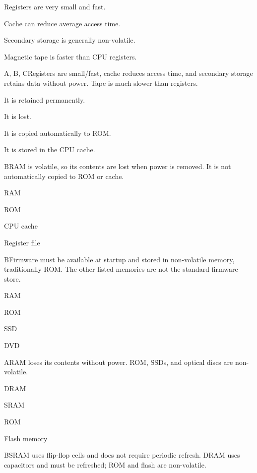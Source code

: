 \begin{enumerate}[label=\textbf{Q\arabic*.}, leftmargin=*]
  {\item Registers are very small and fast.
   \item Cache can reduce average access time.
   \item Secondary storage is generally non-volatile.
   \item Magnetic tape is faster than CPU registers.}
  {A, B, C}{Registers are small/fast, cache reduces access time, and secondary storage retains data without power. Tape is much slower than registers.}
\fi
\ifnum{}
  {\item It is retained permanently.
   \item It is lost.
   \item It is copied automatically to ROM.
   \item It is stored in the CPU cache.}
  {B}{RAM is volatile, so its contents are lost when power is removed. It is not automatically copied to ROM or cache.}
  {\item RAM
   \item ROM
   \item CPU cache
   \item Register file}
  {B}{Firmware must be available at startup and stored in non-volatile memory, traditionally ROM. The other listed memories are not the standard firmware store.}
  {\item RAM
   \item ROM
   \item SSD
   \item DVD}
  {A}{RAM loses its contents without power. ROM, SSDs, and optical discs are non-volatile.}
  {\item DRAM
   \item SRAM
   \item ROM
   \item Flash memory}
  {B}{SRAM uses flip-flop cells and does not require periodic refresh. DRAM uses capacitors and must be refreshed; ROM and flash are non-volatile.}

\end{enumerate}
